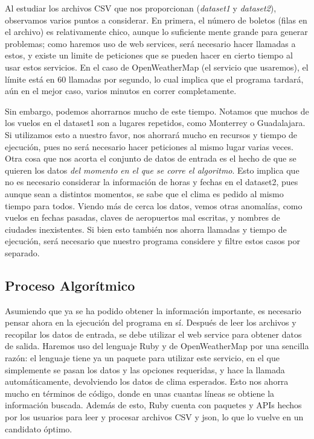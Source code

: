 \documentclass[11 pt]{article}
\theoremstyle{remark}
\begin{document}
		Al estudiar los archivos CSV que nos proporcionan (\emph{dataset1} y \emph{dataset2}), observamos varios puntos a considerar. En primera, el número de boletos (filas en el archivo) es relativamente chico, aunque lo suficiente mente grande para generar problemas; como haremos uso de web services, será necesario hacer llamadas a estos, y existe un limite de peticiones que se pueden hacer en cierto tiempo al usar estos servicios. En el caso de OpenWeatherMap (el servicio que usaremos), el límite está en 60 llamadas por segundo, lo cual implica que el programa  tardará, aún en el mejor caso, varios minutos en correr completamente.
		
		Sin embargo, podemos ahorrarnos mucho de este tiempo. Notamos que muchos de los vuelos en el dataset1 son a lugares repetidos, como Monterrey o Guadalajara. Si utilizamos esto a nuestro favor, nos ahorrará mucho en recursos y tiempo de ejecución, pues no será necesario hacer peticiones al mismo lugar varias veces. Otra cosa que nos acorta el conjunto de datos de entrada es el hecho de que se quieren los datos \emph{del momento en el que se corre el algoritmo}. Esto implica que no es necesario considerar la información de horas y fechas en el dataset2, pues aunque sean a distintos momentos, se sabe que el clima es pedido al mismo tiempo para todos. Viendo más de cerca los datos, vemos otras anomalías, como vuelos en fechas pasadas, claves de aeropuertos mal escritas, y nombres de ciudades inexistentes. Si bien esto también nos ahorra llamadas y tiempo de ejecución, será necesario que nuestro programa considere y filtre estos casos por separado.
		
		
	\subsection{Proceso Algorítmico}
		
		Asumiendo que ya se ha podido obtener la información importante, es necesario pensar ahora en la ejecución del programa en sí. Después de leer los archivos y recopilar los datos de entrada, se debe utilizar el web service para obtener datos de salida. Haremos uso del lenguaje Ruby y de OpenWeatherMap por una sencilla razón: el lenguaje tiene ya un paquete para utilizar este servicio, en el que simplemente se pasan los datos y las opciones requeridas, y hace la llamada automáticamente, devolviendo los datos de clima esperados. Esto nos ahorra mucho en términos de código, donde en unas cuantas líneas se obtiene la información buscada. Además de esto, Ruby cuenta con paquetes y APIs hechos por los usuarios para leer y procesar archivos CSV y json, lo que lo vuelve en un candidato óptimo.
		
\end{document}
